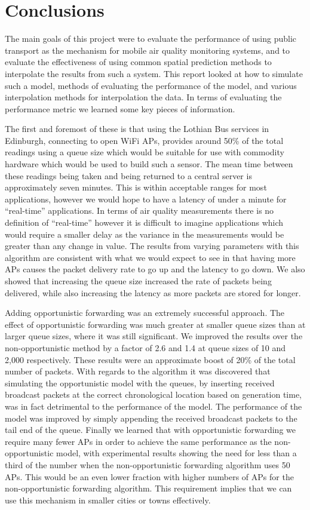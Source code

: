 \chapter{Conclusions}\label{conclusions}


The main goals of this project were to evaluate the performance of using public transport as the mechanism for mobile air quality monitoring systems, and to evaluate the effectiveness of using common spatial prediction methods to interpolate the results from such a system. This report looked at how to simulate such a model, methods of evaluating the performance of the model, and various interpolation methods for interpolation the data. In terms of evaluating the performance metric we learned some key pieces of information. 

The first and foremost of these is that using the Lothian Bus services in Edinburgh, connecting to open WiFi APs, provides around 50\% of the total readings using a queue size which would be suitable for use with commodity hardware which would be used to build such a sensor. The mean time between these readings being taken and being returned to a central server is approximately seven minutes. This is within acceptable ranges for most applications, however we would hope to have a latency of under a minute for ``real-time'' applications. In terms of air quality measurements there is no definition of ``real-time'' however it is difficult to imagine applications which would require a smaller delay as the variance in the measurements would be greater than any change in value. The results from varying parameters with this algorithm are consistent with what we would expect to see in that having more APs causes the packet delivery rate to go up and the latency to go down. We also showed that increasing the queue size increased the rate of packets being delivered, while also increasing the latency as more packets are stored for longer. 

Adding opportunistic forwarding was an extremely successful approach. The effect of opportunistic forwarding was much greater at smaller queue sizes than at larger queue sizes, where it was still significant. We improved the results over the non-opportunistic method by a factor of 2.6 and 1.4 at queue sizes of 10 and 2,000 respectively. These results were an approximate boost of 20\% of the total number of packets. With regards to the algorithm it was discovered that simulating the opportunistic model with the queues, by inserting received broadcast packets at the correct chronological location based on generation time, was in fact detrimental to the performance of the model. The performance of the model was improved by simply appending the received broadcast packets to the tail end of the queue. Finally we learned that with opportunistic forwarding we require many fewer APs in order to achieve the same performance as the non-opportunistic model, with experimental results showing the need for less than a third of the number when the non-opportunistic forwarding algorithm uses 50 APs. This would be an even lower fraction with higher numbers of APs for the non-opportunistic forwarding algorithm. This requirement implies that we can use this mechanism in smaller cities or towns effectively. 

